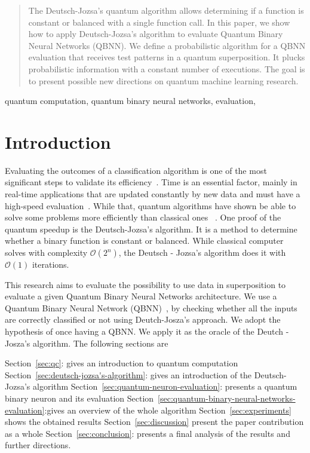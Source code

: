 \documentclass[conference]{IEEEtran}
\begin{document}
\begin{abstract}
The Deutsch-Jozsa's quantum algorithm allows determining if a function is constant or balanced with a single function call.
In this paper, we show how to apply Deutsch-Jozsa's algorithm to evaluate Quantum Binary Neural Networks (QBNN).
We define a probabilistic algorithm for a QBNN evaluation that receives test patterns in a quantum superposition.
It plucks probabilistic information with a constant number of executions.
The goal is to present possible new directions on quantum machine learning research.
\end{abstract}

\begin{IEEEkeywords}
quantum computation, quantum binary neural networks, evaluation,
\end{IEEEkeywords}

\section{Introduction}\label{sec:introduction}
Evaluating the outcomes of a classification algorithm is one of the most significant steps to validate its
efficiency~\cite{japkowicz2006question}.
Time is an essential factor, mainly in
real-time applications that are updated constantly by new data and must have a high-speed evaluation~\cite{chen2012classifier}.
While that,  quantum algorithms have shown be able to solve some problems more efficiently than classical ones
~\cite{deutsch1992rapid}.
One proof of the quantum speedup is the Deutsch-Jozsa's algorithm.
It is a method to determine whether a binary function is constant or balanced.
While classical computer solves with complexity \(\mathcal{O}(2^{n})\),
the Deutsch - Jozsa's algorithm does it with \(\mathcal{O}(1)\) iterations.

This research aims to evaluate the possibility to use data in superposition to evaluate a given Quantum Binary Neural Networks architecture.
We use a Quantum Binary Neural Network
(QBNN)~\cite{fawaz2019training}, by checking whether all the inputs are correctly classified or not using Deutch-Josza's approach.
We adopt the hypothesis of once having a QBNN. We apply it as the oracle of the Deutch - Josza's algorithm.
The following sections are

Section~\ref{sec:qc}: gives an introduction to quantum computation
Section~\ref{sec:deutsch-jozsa's-algorithm}: gives an introduction of the Deutsch-Jozsa's algorithm
Section~\ref{sec:quantum-neuron-evaluation}: presents a quantum binary neuron and its evaluation
Section~\ref{sec:quantum-binary-neural-networks-evaluation}:gives an overview of the whole algorithm
Section~\ref{sec:experiments} shows the obtained results
Section~\ref{sec:discussion} present the paper contribution as a whole
Section~\ref{sec:conclusion}: presents a final analysis of the results and further directions.
\end{document}
